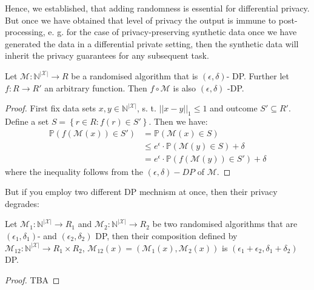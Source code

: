Hence, we established, that adding randomness is essential for differential privacy. But once we have obtained that level of privacy the output is immune to post-processing, e. g. for the case of privacy-preserving synthetic data once we have generated the data in a differential private setting, then the synthetic data will inherit the privacy guarantees for any subsequent task.

\begin{thm} \label{thm:postpro}
    Let $\mathcal{M}: \mathbb{N}^{|\mathcal{X}|} \rightarrow R$ be a randomised algorithm that is $(\epsilon, \delta)$- DP. Further let $f: R \rightarrow R'$ an arbitrary function. Then $f \circ \mathcal{M}$ is also $(\epsilon, \delta)$ -DP.
\end{thm}
\begin{proof}
    First fix data sets $x,y \in \mathbb{N}^{|\mathcal{X}|}$, s. t. $||x-y||_1\le 1$ and outcome $S' \subseteq R'$. Define a set $S=\left\{r\in R: f(r) \in S'\right\}$. Then we have:
    \begin{align}
        \mathbb{P}(f(\mathcal{M}(x))\in S') &= \mathbb{P}(\mathcal{M}(x)\in S) \nonumber \\
        &\le e^\epsilon \cdot \mathbb{P}(\mathcal{M}(y)\in S) + \delta \nonumber \\
        &= e^\epsilon \cdot \mathbb{P}(f(\mathcal{M}(y))\in S') + \delta
    \end{align}
    where the inequality follows from the $(\epsilon, \delta)-DP$ of $\mathcal{M}$.
\end{proof}

But if you employ two different DP mechnism at once, then their privacy degrades:

\begin{thm}
    Let $\mathcal{M}_1: \mathbb{N}^{|\mathcal{X}|} \rightarrow R_1$ and $\mathcal{M}_2: \mathbb{N}^{|\mathcal{X}|} \rightarrow R_2$ be two randomised algorithms that are $(\epsilon_1, \delta_1)$- and $(\epsilon_2, \delta_2)$ DP, then their composition defined by $\mathcal{M}_{12}: \mathbb{N}^{|\mathcal{X}|} \rightarrow R_1 \times R_2$, $\mathcal{M}_{12}(x)=(\mathcal{M}_{1}(x), \mathcal{M}_{2}(x))$ is $(\epsilon_1+\epsilon_2, \delta_1+\delta_2)$ DP.
\end{thm}
\begin{proof}
    TBA
\end{proof}

